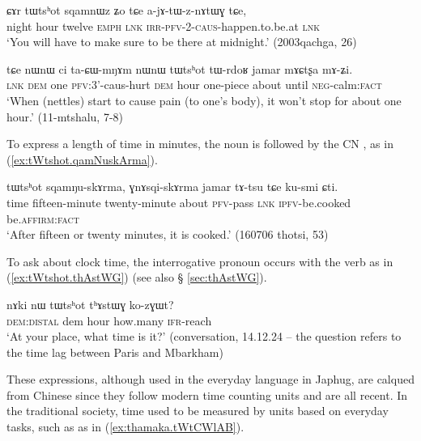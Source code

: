 \begin{exe}
\ex \label{ex:tWtshot.sqamnWz}
\gll ɕɤr tɯtsʰot sqamnɯz ʑo tɕe a-jɤ-tɯ-z-nɤtɯɣ tɕe, \\
 night hour twelve \textsc{emph} \textsc{lnk}  \textsc{irr}-\textsc{pfv}-2-\textsc{caus}-happen.to.be.at \textsc{lnk} \\
\glt `You will have to make sure to be there at midnight.' (2003qachga, 26)
\end{exe}
 
\begin{exe}
\ex \label{ex:tWtshot.tWrdoR}
\gll  tɕe nɯnɯ ci ta-ɕɯ-mŋɤm nɯnɯ tɯtsʰot tɯ-rdoʁ jamar mɤɕtʂa mɤ-ʑi. \\
 \textsc{lnk} \textsc{dem} one \textsc{pfv}:3'-caus-hurt \textsc{dem} hour one-piece about until \textsc{neg}-calm:\textsc{fact} \\
\glt `When (nettles) start to cause pain (to one's body), it won't stop for about one hour.' (11-mtshalu, 7-8)
\end{exe}

To express a length of time in minutes, the noun    is followed by the CN , as in (\ref{ex:tWtshot.qamNuskArma}).
  
\begin{exe}
\ex \label{ex:tWtshot.qamNuskArma}
\gll  tɯtsʰot sqamŋu-skɤrma, ɣnɤsqi-skɤrma jamar tɤ-tsu tɕe ku-smi ɕti. \\
 time fifteen-minute twenty-minute about \textsc{pfv}-pass \textsc{lnk} \textsc{ipfv}-be.cooked be.\textsc{affirm}:\textsc{fact} \\
\glt `After fifteen or twenty minutes, it is cooked.' (160706 thotsi, 53)
\end{exe}

To ask about clock time, the interrogative pronoun  occurs with the verb  as in (\ref{ex:tWtshot.thAstWG}) (see also § \ref{sec:thAstWG}).

\begin{exe}
\ex \label{ex:tWtshot.thAstWG}
\gll     nɤki nɯ tɯtsʰot tʰɤstɯɣ ko-zɣɯt? \\
 \textsc{dem}:\textsc{distal} dem hour how.many \textsc{ifr}-reach \\
\glt  `At your place, what time is it?' (conversation, 14.12.24 -- the question refers to the time lag between Paris and Mbarkham)
\end{exe}
    
 These expressions, although used in the everyday language in Japhug, are calqued from Chinese since they follow modern time counting units and are all recent. In the traditional society, time used to be measured by units based on everyday tasks, such as  as in  (\ref{ex:thamaka.tWtCWlAB}).
 
